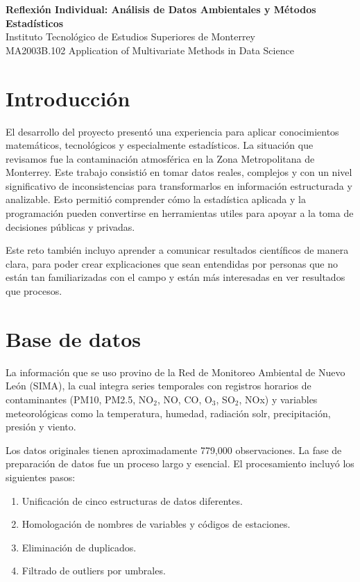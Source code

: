 \documentclass[11pt]{article}
\begin{document}
    \begin{center}
        \textbf{Reflexión Individual: Análisis de Datos Ambientales y Métodos Estadísticos} \\
        Instituto Tecnológico de Estudios Superiores de Monterrey \\
        MA2003B.102 Application of Multivariate Methods in Data Science \\
    \end{center}

    \section*{Introducción}
    El desarrollo del proyecto presentó una experiencia para aplicar conocimientos matemáticos, tecnológicos y especialmente estadísticos.
    La situación que revisamos fue la contaminación atmosférica en la Zona Metropolitana de Monterrey.
    Este trabajo consistió en tomar datos reales, complejos y con un nivel significativo de inconsistencias para transformarlos en información estructurada y analizable.
    Esto permitió comprender cómo la estadística aplicada y la programación pueden convertirse en herramientas utiles para apoyar a la toma de decisiones públicas y privadas.

    Este reto también incluyo aprender a comunicar resultados científicos de manera clara, para poder crear explicaciones que sean entendidas por personas que no están tan familiarizadas con el campo y están más interesadas en ver resultados que procesos.

    \section*{Base de datos}

    La información que se uso provino de la Red de Monitoreo Ambiental de Nuevo León (SIMA), la cual integra series temporales con registros horarios de contaminantes (PM10, PM2.5, NO$_2$, NO, CO, O$_3$, SO$_2$, NOx) y variables meteorológicas como la temperatura, humedad, radiación solr, precipitación, presión y viento.

    Los datos originales tienen aproximadamente 779,000 observaciones.
    La fase de preparación de datos fue un proceso largo y esencial.
    El procesamiento incluyó los siguientes pasos:
    \begin{enumerate}
        \item Unificación de cinco estructuras de datos diferentes.
        \item Homologación de nombres de variables y códigos de estaciones.
        \item Eliminación de duplicados.
        \item Filtrado de outliers por umbrales.
    \end{enumerate}
\end{document}

